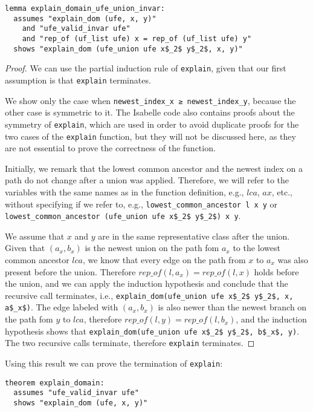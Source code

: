 \begin{lstlisting}
lemma explain_domain_ufe_union_invar:
  assumes "explain_dom (ufe, x, y)"
    and "ufe_valid_invar ufe"
    and "rep_of (uf_list ufe) x = rep_of (uf_list ufe) y"
  shows "explain_dom (ufe_union ufe x$_2$ y$_2$, x, y)"
\end{lstlisting}

\begin{proof}
We can use the partial induction rule of \lstinline|explain|, given that our first assumption is that \lstinline|explain| terminates.

We show only the case when \lstinline|newest_index_x ≥ newest_index_y|, because the other case is symmetric to it. The Isabelle code also contains proofs about the symmetry of \lstinline{explain}, which are used in order to avoid duplicate proofs for the two cases of the \lstinline{explain} function, but they will not be discussed here, as they are not essential to prove the correctness of the function.

Initially, we remark that the lowest common ancestor and the newest index on a path do not change after a union was applied. Therefore, we will refer to the variables with the same names as in the function definition, e.g., $lca$, $ax$, etc., without specifying if we refer to, e.g., \lstinline|lowest_common_ancestor l x y| or \lstinline|lowest_common_ancestor (ufe_union ufe x$_2$ y$_2$) x y|.

We assume that $x$ and $y$ are in the same representative class after the union.
Given that $(a_x, b_x)$ is the newest union on the path fom $a_x$ to the lowest common ancestor $lca$, we know that every edge on the path from $x$ to $a_x$ was also present before the union. Therefore $rep\_of(l, a_x) = rep\_of(l, x)$ holds before the union, and we can apply the induction hypothesis and conclude that the recursive call terminates, i.e., \lstinline|explain_dom(ufe_union ufe x$_2$ y$_2$, x, a$_x$)|. The edge labeled with $(a_x, b_x)$ is also newer than the newest branch on the path fom $y$ to $lca$, therefore $rep\_of(l, y) = rep\_of(l, b_x)$, and the induction hypothesis shows that \lstinline|explain_dom(ufe_union ufe x$_2$ y$_2$, b$_x$, y)|. The two recursive calls terminate, therefore \lstinline|explain| terminates.
\end{proof}

Using this result we can prove the termination of \lstinline|explain|:

\begin{lstlisting}
theorem explain_domain:
  assumes "ufe_valid_invar ufe"
  shows "explain_dom (ufe, x, y)"
\end{lstlisting}

